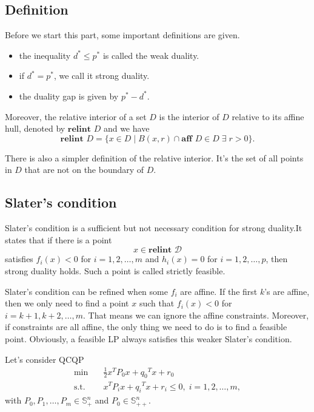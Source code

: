 \documentclass[lang=en,color=blue,mode=fancy,titlestyle=hang]{elegantbook}
\begin{document}
\subsection{Definition}
Before we start this part, some important definitions are given.
\begin{itemize}
  \item the inequality $d^* \leq p^*$ is called the weak duality.
  \item if $d^* = p^*$, we call it strong duality.
  \item the duality gap is given by $p^* - d^*$.
\end{itemize}

Moreover, the relative interior of a set $D$ is the interior of $D$ relative to its affine hull,
denoted by $\textbf{relint } D$ and we have
\[
\textbf{relint } D = \{ x \in D \;|\; B(x,r) \cap \textbf{aff } D \in D \; \exists \; r > 0 \}.
\]

There is also a simpler definition of the relative interior. It's the set of all points in
$D$ that are not on the boundary of $D$.

\subsection{Slater's condition}

Slater's condition is a sufficient but not necessary condition for strong duality.It states
that if there is a point
\[
x \in \textbf{relint } \mathcal{D}
\]
satisfies $f_i(x) < 0$ for $i = 1, 2, \ldots, m$ and $h_i(x) = 0$ for $i = 1, 2, \ldots, p$,
then strong duality holds. Such a point is called strictly feasible.

Slater's condition can be refined when some $f_i$ are affine. If the first $k$'s are affine,
then we only need to find a point $x$ such that $f_i(x) < 0$ for $i = k + 1, k + 2, \ldots, m$.
That means we can ignore the affine constraints. Moreover, if constraints are all affine,
the only thing we need to do is to find a feasible point. Obviously, a feasible LP always
satisfies this weaker Slater's condition.

Let's consider QCQP
\begin{align*}
\min \quad &\frac12 x^T P_0 x + {q_0}^T x + r_0\\
\text{s.t.} \quad &x^T P_i x + {q_i}^T x + r_i \leq 0, \; i = 1, 2, \ldots, m,
\end{align*}
with $P_0, P_1, \ldots, P_m \in \mathbb{S}^n_+$ and $P_0 \in \mathbb{S}^n_{++}$.
\end{document}
